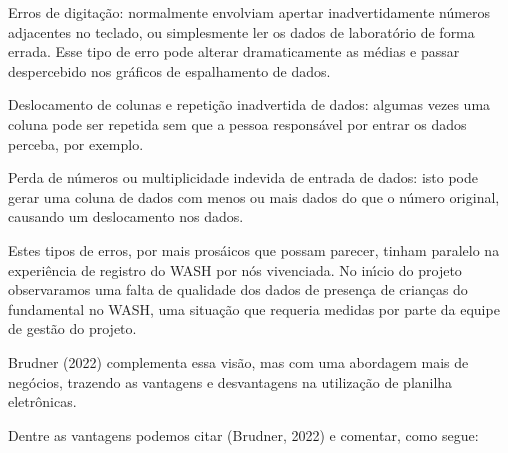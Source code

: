 \documentclass[
12pt,		%
openright,	%
twoside,  %
a4paper,			%
chapter=TITLE,		%
english,			%
french,				%
spanish,			%
brazil				%
]{USPSC-classe/USPSC_RedarTex}
\begin{document}
\begin{alineas}
\item Erros de digita\c{c}\~ao: normalmente envolviam apertar inadvertidamente n\'umeros adjacentes no teclado, ou simplesmente ler os dados de laborat\'orio de forma errada. Esse tipo de erro pode alterar dramaticamente as m\'edias e passar despercebido nos gr\'aficos de espalhamento de dados.
\item Deslocamento de colunas e repeti\c{c}\~ao inadvertida de dados: algumas vezes uma coluna pode ser repetida sem que a pessoa respons\'avel por entrar os dados perceba, por exemplo.
\item Perda de n\'umeros ou multiplicidade indevida de entrada de dados: isto pode gerar uma coluna de dados com menos ou mais dados do que o n\'umero original, causando um deslocamento nos dados.
\end{alineas}

Estes tipos de erros, por mais pros\'aicos que possam parecer, tinham paralelo na experi\^encia de registro do WASH por n\'os vivenciada. No in\'{\i}cio do projeto observaramos uma falta de qualidade dos dados de presen\c{c}a de crian\c{c}as do fundamental no WASH, uma situa\c{c}\~ao que requeria medidas por parte da equipe de gest\~ao do projeto.








 Brudner (2022) complementa essa vis\~ao, mas com uma abordagem mais de neg\'ocios, trazendo as vantagens e desvantagens na utiliza\c{c}\~ao de planilha eletr\^onicas.








Dentre as vantagens podemos citar (Brudner, 2022) e comentar, como segue:
\end{document}
